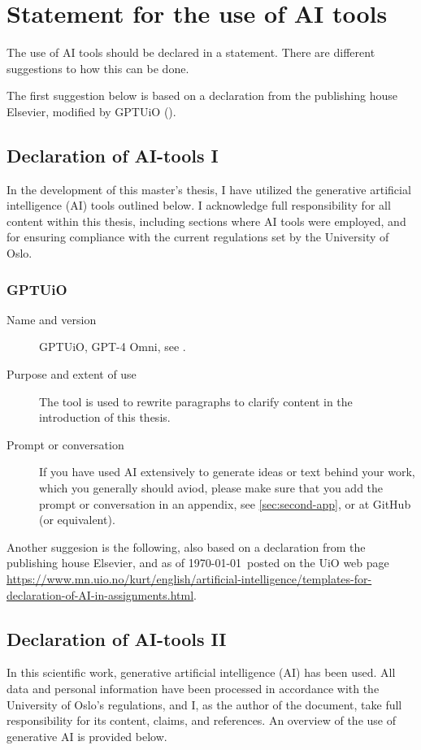 \section{Statement for the use of AI tools}
The use of AI tools should be declared in a statement. There are different suggestions to how this can be done. 

The first suggestion below is based on a declaration from the publishing house Elsevier, modified by GPTUiO (\cite{uiogpt}). 

\subsection*{Declaration of AI-tools I}
In the development of this master's thesis, I have utilized the generative artificial intelligence (AI) tools outlined below. I acknowledge full responsibility for all content within this thesis, including sections where AI tools were employed, and for ensuring compliance with the current regulations set by the University of Oslo.

\subsubsection{GPTUiO}
\begin{description}
    \item[Name and version] GPTUiO, GPT-4 Omni, see \cite{uiogpt}.
    \item[Purpose and extent of use] The tool is used to rewrite paragraphs to clarify content in the introduction of this thesis.
    \item[Prompt or conversation] If you have used AI extensively to generate ideas or text behind your work, which you generally should aviod, please make sure that you add the prompt or conversation in an appendix, see \cref{sec:second-app}, or at GitHub (or equivalent). 
\end{description}

Another suggesion is the following, also based on a declaration from the publishing house Elsevier, and as of \today\, posted on the UiO web page \url{https://www.mn.uio.no/kurt/english/artificial-intelligence/templates-for-declaration-of-AI-in-assignments.html}.

\subsection*{Declaration of AI-tools II}
In this scientific work, generative artificial intelligence (AI) has been used. All data and personal information have been processed in accordance with the University of Oslo's regulations, and I, as the author of the document, take full responsibility for its content, claims, and references. An overview of the use of generative AI is provided below.

